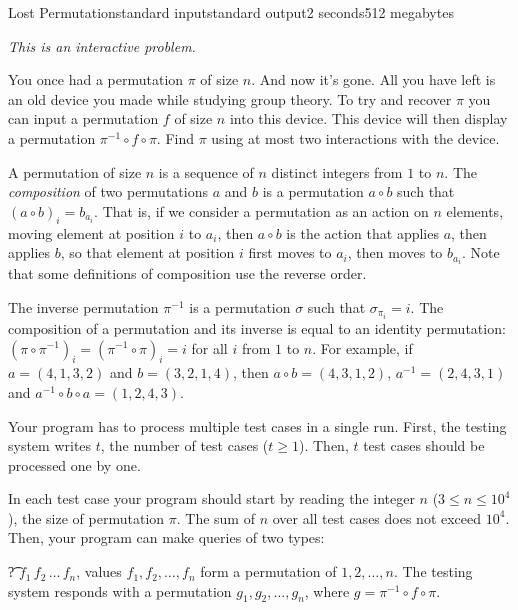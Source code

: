 \begin{problem}{Lost Permutation}{standard input}{standard output}{2 seconds}{512 megabytes}

\textit{This is an interactive problem.}

You once had a permutation $\pi$ of size $n$. And now it's gone. All you have left is an old device you made while studying group theory. To try and recover $\pi$ you can input a permutation $f$ of size $n$ into this device. This device will then display a permutation $\pi^{-1} \circ f \circ \pi$. Find $\pi$ using at most two interactions with the device.


A permutation of size $n$ is a sequence of $n$ distinct integers from $1$ to $n$. The \textit{composition} of two permutations $a$ and $b$ is a permutation $a \circ b$ such that $(a \circ b)_i = b_{a_i}$. That is, if we consider a permutation as an action on $n$ elements, moving element at position $i$ to $a_i$, then $a \circ b$ is the action that applies $a$, then applies $b$, so that element at position $i$ first moves to $a_i$, then moves to $b_{a_i}$. Note that some definitions of composition use the reverse order.

The inverse permutation $\pi^{-1}$ is a permutation $\sigma$ such that $\sigma_{\pi_i} = i$. The composition of a permutation and its inverse is equal to an identity permutation: $(\pi \circ \pi^{-1})_i =  (\pi^{-1} \circ \pi)_i = i$ for all $i$ from $1$ to $n$. For example, if $a = (4, 1, 3, 2)$ and $b = (3, 2, 1, 4)$, then $a \circ b = (4, 3, 1, 2)$, $a^{-1} = (2, 4, 3, 1)$ and $a^{-1} \circ b \circ a = (1, 2, 4, 3)$.

\Interaction
Your program has to process multiple test cases in a single run. First, the testing system writes $t$, the number of test cases ($t \ge 1$). Then, $t$ test cases should be processed one by one.

In each test case your program should start by reading the integer $n$ ($3 \le n \le 10^4$), the size of permutation $\pi$. The sum of $n$ over all test cases does not exceed $10^4$. Then, your program can make queries of two types:

\vspace{-1mm}
\begin{shortitems}
\item \t{? $f_1 \, f_2 \, \ldots \, f_n$}, values $f_1, f_2, \ldots, f_n$ form a permutation of $1, 2, \ldots, n$. The testing system responds with a permutation $g_1, g_2, \ldots, g_n$, where $g = \pi^{-1} \circ f \circ \pi$.


\end{shortitems}
\end{problem}
